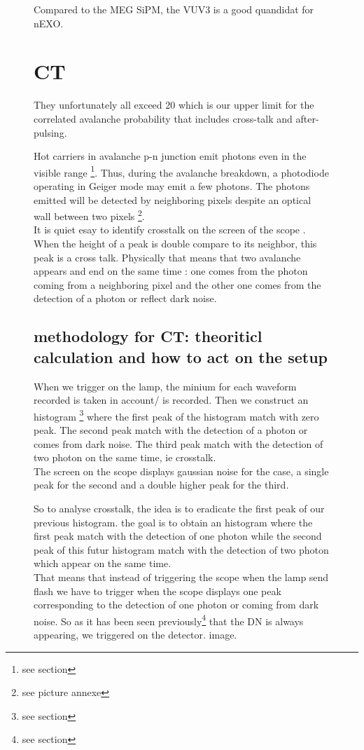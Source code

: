 \begin{figure}[!hbtp]
  
  Compared to the MEG SiPM, the VUV3 is a good quandidat for nEXO.  
  
  \section{CT}
  
  They unfortunately all exceed 20%
  which is our upper limit for the correlated avalanche probability that includes cross-talk and after-pulsing.
  
  Hot carriers in avalanche p-n junction emit photons even in the visible range \footnote{see section}. Thus, 
  during the avalanche breakdown, a photodiode operating in Geiger mode may emit a few photons. 
  The photons emitted will be detected by neighboring pixels despite an optical wall between two pixels \footnote{see picture annexe}. 
  \\
  
  It is quiet esay to identify crosstalk on the screen of the scope . 
  When the height of a peak is double compare to its neighbor, this peak is a cross talk. Physically that means that two avalanche appears and end 
  on the same time : one comes from the photon coming from a neighboring pixel and the other one comes from the detection of a photon or 
  reflect dark noise. 
  
  \subsection{methodology for CT: theoriticl calculation and how to act on the setup}
  
  When we trigger on the lamp, the minium for each waveform recorded is taken in account/ is recorded. Then we construct an histogram 
  \footnote{see section} where the first peak of the histogram match with zero peak. The second peak match with the detection of a photon or 
  comes from dark noise. The third peak match with the detection of two photon on the same time, ie crosstalk.\\
  The screen on the scope displays gaussian noise for the case, a single peak for the second and a double higher peak for the third. 
  
  So to analyse crosstalk, the idea is to eradicate the first peak of our previous histogram. the goal
  is to obtain an histogram where the first peak match with the detection of 
  one photon while the second peak of this futur histogram match with the detection of two photon which appear on the 
  same time.\\
  That means that instead of triggering the scope when the lamp send flash we have to trigger when the scope displays
  one peak corresponding to the detection of one photon or coming from dark noise. 
  So as it has been seen previously\footnote{see section} that the DN is always appearing, we triggered on the detector. 
  image. 
  

\end{figure}
